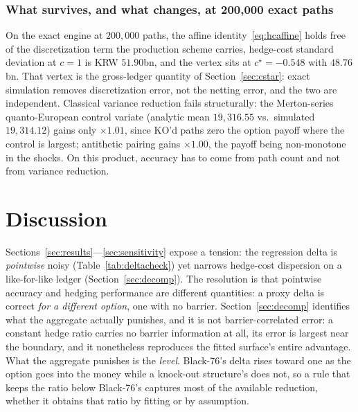 \documentclass[11pt,a4paper]{article}
\begin{document}
\subsubsection{What survives, and what changes, at 200{,}000 exact paths}
\label{sec:rigor200k}

On the exact engine at $200{,}000$ paths, the affine identity~\eqref{eq:hcaffine} holds free of the discretization term the production scheme carries, hedge-cost standard deviation at $c=1$ is KRW $51.90$bn, and the vertex sits at $c^\star=-0.548$ with $48.76$bn. That vertex is the gross-ledger quantity of Section~\ref{sec:cstar}: exact simulation removes discretization error, not the netting error, and the two are independent. Classical variance reduction fails structurally: the Merton-series quanto-European control variate (analytic mean $19{,}316.55$ vs.\ simulated $19{,}314.12$) gains only $\times1.01$, since KO'd paths zero the option payoff where the control is largest; antithetic pairing gains $\times1.00$, the payoff being non-monotone in the shocks. On this product, accuracy has to come from path count and not from variance reduction.

\section{Discussion}
\label{sec:discussion}

Sections~\ref{sec:results}---\ref{sec:sensitivity} expose a tension: the regression delta is \emph{pointwise} noisy (Table~\ref{tab:deltacheck}) yet narrows hedge-cost dispersion on a like-for-like ledger (Section~\ref{sec:decomp}). The resolution is that pointwise accuracy and hedging performance are different quantities: a proxy delta is correct \emph{for a different option}, one with no barrier. Section~\ref{sec:decomp} identifies what the aggregate actually punishes, and it is not barrier-correlated error: a constant hedge ratio carries no barrier information at all, its error is largest near the boundary, and it nonetheless reproduces the fitted surface's entire advantage. What the aggregate punishes is the \emph{level}. Black-76's delta rises toward one as the option goes into the money while a knock-out structure's does not, so a rule that keeps the ratio below Black-76's captures most of the available reduction, whether it obtains that ratio by fitting or by assumption.
\end{document}
